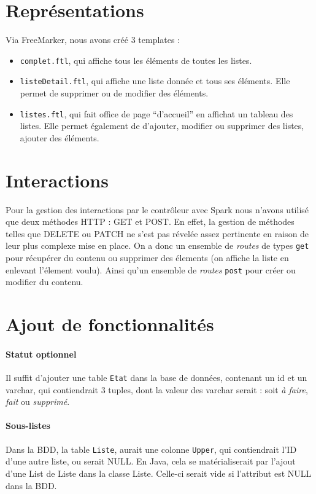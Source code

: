 \documentclass[11pt, a4paper]{article}
\begin{document}
\section{Représentations}

Via FreeMarker, nous avons créé 3 templates :
\begin{itemize}
	\item \verb|complet.ftl|, qui affiche tous les éléments de toutes les listes.
	\item \verb|listeDetail.ftl|, qui affiche une liste donnée et tous ses éléments. Elle permet de supprimer ou de modifier des éléments.
	\item \verb|listes.ftl|, qui fait office de page ``d'accueil'' en affichat un tableau des listes. Elle permet également de d'ajouter, modifier ou supprimer des listes, ajouter des éléments.
\end{itemize}

\section{Interactions}

Pour la gestion des interactions par le contrôleur avec Spark nous n'avons utilisé que deux méthodes HTTP : GET et POST. En effet, la gestion de méthodes telles que DELETE ou PATCH ne s'est pas révelée assez pertinente en raison de leur plus complexe mise en place. On a donc un ensemble de \emph{routes} de types \verb|get| pour récupérer du contenu ou supprimer des élements (on affiche la liste en enlevant l'élement voulu). Ainsi qu'un ensemble de \emph{routes} \verb|post| pour créer ou modifier du contenu.

\section{Ajout de fonctionnalités}

\paragraph{Statut optionnel} Il suffit d'ajouter une table \verb|Etat| dans la base de données, contenant un id et un varchar, qui contiendrait 3 tuples, dont la valeur des varchar serait : soit \emph{à faire}, \emph{fait} ou \emph{supprimé}.

\paragraph{Sous-listes}
Dans la BDD, la table \verb|Liste|, aurait une colonne \verb|Upper|, qui contiendrait l'ID d'une autre liste, ou serait NULL.
En Java, cela se matérialiserait par l'ajout d'une List de Liste dans la classe Liste. Celle-ci serait vide si l'attribut est NULL dans la BDD.
\end{document}
